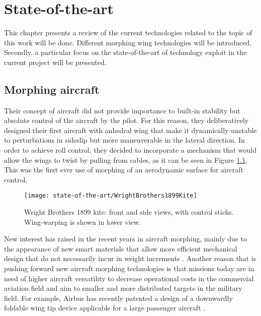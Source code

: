 \chapter{State-of-the-art} \label{chap:State_of_the_art}

This chapter presents a review of the current technologies related to the topic of this work will be done. Different morphing wing technologies will be introduced. Secondly, a particular focus on the state-of-the-art of technology exploit in the current project will be presented.

\section{Morphing aircraft} \label{sec:Morphing_state}

  Their concept of aircraft did not provide importance to built-in stability but absolute control of the aircraft by the pilot. For this reason, they deliberatively designed their first aircraft with anhedral wing that make it dynamically unstable to perturbations in sideslip but more maneuverable in the lateral direction. In order to achieve roll control, they decided to incorporate a mechanism that would allow the wings to twist by pulling from cables, as it can be seen in Figure \ref{fig:Wright}. This was the first ever use of morphing of an aerodynamic surface for aircraft control.

  \begin{figure}[!htpb]
    \centering
    \texttt{[image: state-of-the-art/WrightBrothers1899Kite]}
    \caption[Wright Brothers 1899 kite]{Wright Brothers 1899 kite: front and side views, with control sticks. Wing-warping is shown in lower view. \cite{Wright}}\label{fig:Wright}
  \end{figure}

  New interest has raised in the recent years in aircraft morphing, mainly due to the appearance of new smart materials that allow more efficient mechanical design that do not necessarily incur in weight increments \cite{Lloyd2007}. Another reason that is pushing forward new aircraft morphing technologies is that missions today are in need of higher aircraft versatility to decrease operational costs in the commercial aviation field and aim to smaller and more distributed targets in the military field. For example, Airbus has recently patented a design of a downwardly foldable wing tip device applicable for a large passenger aircraft \cite{Boye2015}.


